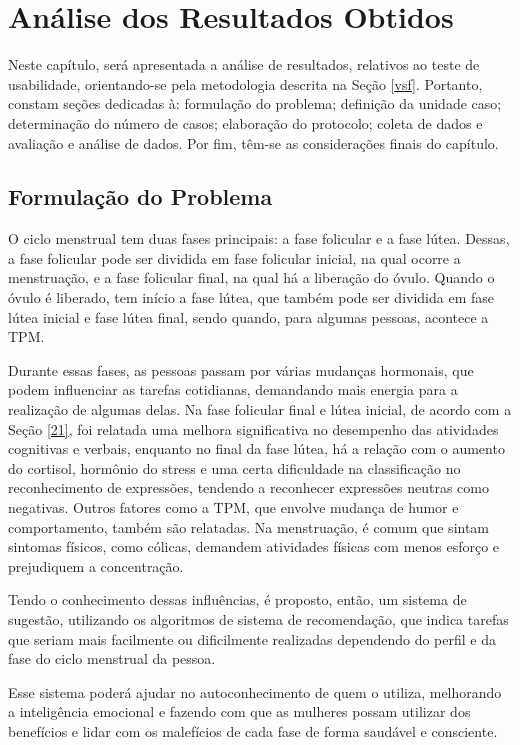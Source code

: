 \chapter[Análise dos Resultados Obtidos]{Análise dos Resultados Obtidos}
\label{ch:capfinal}

Neste capítulo, será apresentada a análise de resultados, relativos ao teste de usabilidade, orientando-se pela metodologia 
descrita na Seção \ref{vsf}. Portanto, constam seções dedicadas à: formulação do problema; definição da unidade 
caso; determinação do número de casos; elaboração do protocolo; coleta de dados e avaliação e análise de dados.
Por fim, têm-se as considerações finais do capítulo.

\section{Formulação do Problema}
O ciclo menstrual tem duas fases principais: a fase folicular e a fase lútea. Dessas, a fase folicular 
pode 
ser dividida em fase folicular inicial, na qual ocorre a menstruação, e a fase folicular final, na qual 
há a liberação do óvulo.
Quando o óvulo é liberado, tem início a fase lútea, que também pode ser dividida em fase lútea inicial e 
fase lútea final, sendo quando, para algumas pessoas, acontece a TPM.

Durante essas fases, as pessoas passam por várias mudanças hormonais, que podem influenciar as tarefas 
cotidianas, demandando mais energia para a realização de algumas delas. Na fase folicular final e lútea inicial, de acordo com a Seção \ref{21}, 
foi relatada uma melhora significativa no desempenho das atividades cognitivas e verbais, enquanto no final da fase 
lútea, há a relação com o aumento do cortisol, hormônio do stress e uma certa dificuldade na classificação 
no reconhecimento de expressões, tendendo a reconhecer expressões neutras como negativas. Outros fatores como a TPM, que envolve
mudança de humor e comportamento, também são relatadas. Na menstruação, é comum que sintam sintomas físicos, como cólicas, demandem 
atividades físicas com menos esforço e prejudiquem a concentração. 

Tendo o conhecimento dessas influências, é proposto, então, um sistema de sugestão, utilizando os algoritmos de sistema de recomendação, 
que indica tarefas que seriam mais facilmente ou dificilmente realizadas dependendo do perfil e da fase do ciclo menstrual da pessoa.

Esse sistema poderá ajudar no autoconhecimento de quem o utiliza, melhorando a inteligência emocional e fazendo com que 
as mulheres possam utilizar dos benefícios e lidar com os malefícios de cada fase de forma saudável e consciente.


